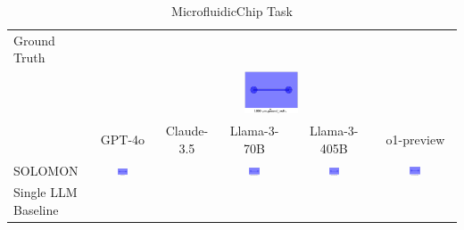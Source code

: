 \begin{table}
  \caption{MicrofluidicChip Task}
  \label{table:microfluidicchip}
  \centering
  \begin{tabular}{@{}lccccc@{}}
    \toprule
    Ground Truth \\
    & \multicolumn{5}{c}{\includegraphics[width=0.15\textwidth]{examples_png/MicrofluidicChip.png}} \\
    & GPT-4o & Claude-3.5 & Llama-3-70B & Llama-3-405B & o1-preview \\
    \midrule
    SOLOMON & \includegraphics[width=0.15\textwidth]{./pool_all/png/gpt-4o_results/MicrofluidicChip.png} &  & \includegraphics[width=0.15\textwidth]{./pool_all/png/claude-3-5-sonnet-20240620_results/MicrofluidicChip.png} & \includegraphics[width=0.15\textwidth]{./pool_all/png/watsonx_meta-llama_llama-3-1-70b-instruct_results/MicrofluidicChip.png} & \includegraphics[width=0.15\textwidth]{./pool_all/png/watsonx_meta-llama_llama-3-405b-instruct_results/MicrofluidicChip.png} \\
    Single LLM Baseline \\

\end{tabular}
\end{table}
